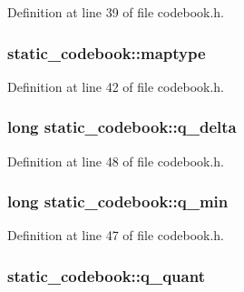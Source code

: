 Definition at line 39 of file codebook.\+h.

\subsubsection[{\texorpdfstring{maptype}{maptype}}]{ static\+\_\+codebook\+::maptype}\hypertarget{structstatic__codebook_a818d20b21c9c6c1d9472a09c4b063794}{}\label{structstatic__codebook_a818d20b21c9c6c1d9472a09c4b063794}


Definition at line 42 of file codebook.\+h.

\subsubsection[{\texorpdfstring{q\+\_\+delta}{q_delta}}]{\setlength{\rightskip}{0pt plus 5cm}long static\+\_\+codebook\+::q\+\_\+delta}\hypertarget{structstatic__codebook_a94d93723dc380cd4fe483094e133ecb4}{}\label{structstatic__codebook_a94d93723dc380cd4fe483094e133ecb4}


Definition at line 48 of file codebook.\+h.

\subsubsection[{\texorpdfstring{q\+\_\+min}{q_min}}]{\setlength{\rightskip}{0pt plus 5cm}long static\+\_\+codebook\+::q\+\_\+min}\hypertarget{structstatic__codebook_a8f11e73cd9db46a04fb86743f078a27c}{}\label{structstatic__codebook_a8f11e73cd9db46a04fb86743f078a27c}


Definition at line 47 of file codebook.\+h.

\subsubsection[{\texorpdfstring{q\+\_\+quant}{q_quant}}]{ static\+\_\+codebook\+::q\+\_\+quant}\hypertarget{structstatic__codebook_aaf7234dd01a51b7a70e3ab06122ee7ca}{}\label{structstatic__codebook_aaf7234dd01a51b7a70e3ab06122ee7ca}


